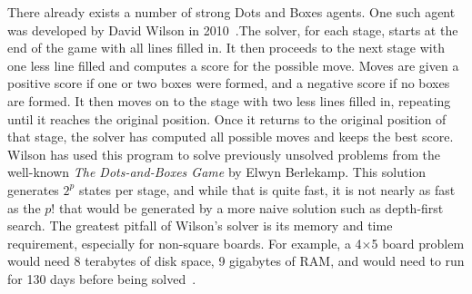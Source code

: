 \documentclass[12pt]{article}
\begin{document}
    There already exists a number of strong Dots and Boxes agents. One such agent was developed by David Wilson in 2010~\cite{Barker_Korf_2012}.The solver, for each stage, starts at the end of the game with all lines filled in. It then proceeds to the next stage with one less line filled and computes a score for the possible move. Moves are given a positive score if one or two boxes were formed, and a negative score if no boxes are formed. It then moves on to the stage with two less lines filled in, repeating until it reaches the original position. Once it returns to the original position of that stage, the solver has computed all possible moves and keeps the best score. Wilson has used this program to solve previously unsolved problems from the well-known \emph{The Dots-and-Boxes Game} by Elwyn Berlekamp. This solution generates \(2^p\) states per stage, and while that is quite fast, it is not nearly as fast as the \(p!\) that would be generated by a more naive solution such as depth-first search. The greatest pitfall of Wilson’s solver is its memory and time requirement, especially for non-square boards. For example, a 4\(\times\)5 board problem would need 8 terabytes of disk space, 9 gigabytes of RAM, and would need to run for 130 days before being solved~\cite{wlson_2002}.
    
\end{document}
